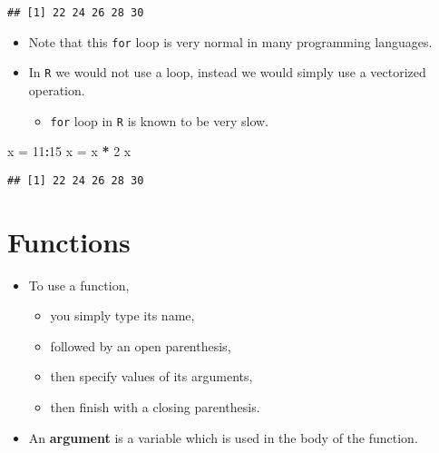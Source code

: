 \documentclass[]{book}
\newenvironment{Shaded}{\begin{snugshade}}{\end{snugshade}}
\newcommand{\DecValTok}[1]{\textcolor[rgb]{0.00,0.00,0.81}{#1}}
\newcommand{\StringTok}[1]{\textcolor[rgb]{0.31,0.60,0.02}{#1}}
\newcommand{\OperatorTok}[1]{\textcolor[rgb]{0.81,0.36,0.00}{\textbf{#1}}}
\newcommand{\NormalTok}[1]{#1}
\providecommand{\tightlist}{%
  \setlength{\itemsep}{0pt}\setlength{\parskip}{0pt}}
\begin{document}
\begin{verbatim}
## [1] 22 24 26 28 30
\end{verbatim}

\begin{itemize}
\tightlist
\item
  Note that this \texttt{for} loop is very normal in many programming
  languages.
\item
  In \texttt{R} we would not use a loop, instead we would simply use a
  vectorized operation.

  \begin{itemize}
  \tightlist
  \item
    \texttt{for} loop in \texttt{R} is known to be very slow.
  \end{itemize}
\end{itemize}

\begin{Shaded}
\begin{Highlighting}[]
\NormalTok{x =}\StringTok{ }\DecValTok{11}\OperatorTok{:}\DecValTok{15}
\NormalTok{x =}\StringTok{ }\NormalTok{x }\OperatorTok{*}\StringTok{ }\DecValTok{2}
\NormalTok{x}
\end{Highlighting}
\end{Shaded}

\begin{verbatim}
## [1] 22 24 26 28 30
\end{verbatim}

\section{Functions}\label{functions}

\begin{itemize}
\tightlist
\item
  To use a function,

  \begin{itemize}
  \tightlist
  \item
    you simply type its name,
  \item
    followed by an open parenthesis,
  \item
    then specify values of its arguments,
  \item
    then finish with a closing parenthesis.
  \end{itemize}
\item
  An \textbf{argument} is a variable which is used in the body of the
  function.
\end{itemize}
\end{document}
